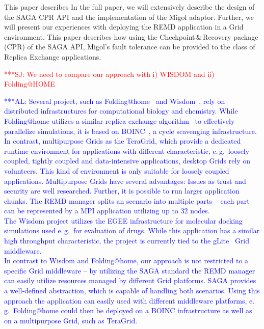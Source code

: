 \documentclass[times, 10pt,twocolumn]{article}
\newcommand{\alnote}[1]{ {\textcolor{blue} { ***AL: #1 }}}
\newcommand{\jhanote}[1]{ {\textcolor{red} { ***SJ: #1 }}}
\begin{document}
This paper describes In the full paper, we will extensively  describe the design of the SAGA CPR API and the implementation 
of the Migol adaptor. Further, we will present our experiences with deploying  
the REMD application in a Grid environment.
This paper describes how using the Checkpoint\,\&\,Recovery package
(CPR) of the SAGA API, Migol's fault tolerance can be provided to the
class of Replica Exchange applications.   

\jhanote{We need to compare our approach with i) WISDOM and ii)
  Folding@HOME}             

\alnote{Several project, such as Folding@home~\cite{folding} and Wisdom~\cite{wisdom}, rely on distributed infrastructures for computational biology and chemistry. While Folding@home utilizes a similar replica exchange algorithm~\cite{PhysRevLett.86.4983} 
to effectively parallelize simulations, it is based on BOINC~\cite{1033223}, a cycle scavenging infrastructure. 
In contrast, multipurpose Grids as the TeraGrid, which provide a dedicated runtime environment for applications with different characteristic, e.\,g.\ loosely coupled, tightly coupled and data-intensive applications, desktop Grids rely on volunteers. This kind of environment is only suitable for loosely coupled applications. Multipurpose Grids have several advantages: Issues as trust and security are well researched. Further, it is possible to run larger application chunks. The REMD manager splits an scenario into multiple parts -- each part can be represented by a MPI application utilizing up to 32 nodes. \\  
The Wisdom project utilizes the EGEE infrastructure for molecular docking simulations used e.\,g.\ for evaluation of drugs. While this application has a similar high throughput characteristic, the project is currently tied to the gLite~\cite{glite2008} Grid middleware.                      \\                             
In contrast to Wisdom and Folding@home, our approach is not restricted to a specific Grid middleware -- by utilizing the SAGA standard the REMD manager can easily utilize resources managed by different Grid platforms. SAGA provides a well-defined abstraction, which is capable of handling both scenarios. Using this approach the application can easily used with different middleware platforms, e.\,g.\ Folding@home could then be deployed on a BOINC infrastructure as well as on a multipurpose Grid, such as TeraGrid.                                                                                                                                                         
}
\end{document}
